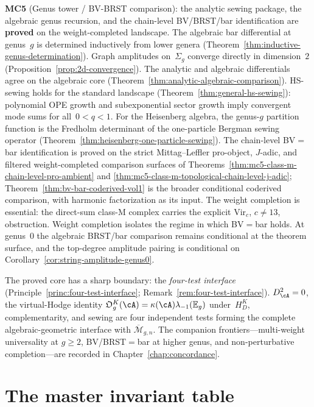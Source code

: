 \noindent\textbf{MC5} (Genus tower / BV-BRST comparison): the
analytic sewing package, the algebraic genus recursion, and the
chain-level BV/BRST/bar identification are \textbf{proved} on the
weight-completed landscape. The algebraic bar differential at
genus~$g$ is determined inductively from lower genera
(Theorem~\ref{thm:inductive-genus-determination}). Graph amplitudes
on~$\Sigma_g$ converge directly in dimension~$2$
(Proposition~\ref{prop:2d-convergence}). The analytic and algebraic
differentials agree on the algebraic core
(Theorem~\ref{thm:analytic-algebraic-comparison}). HS-sewing holds
for the standard landscape (Theorem~\ref{thm:general-hs-sewing}):
polynomial OPE growth and subexponential sector growth imply
convergent mode sums for all~$0 < q < 1$. For the Heisenberg
algebra, the genus-$g$ partition function is the Fredholm
determinant of the one-particle Bergman sewing operator
\textup{(}Theorem~\ref{thm:heisenberg-one-particle-sewing}\textup{)}.
The chain-level BV${}={}$bar identification is proved on the strict
Mittag--Leffler pro-object, $J$-adic, and filtered weight-completed
comparison surfaces of
Theorems~\ref{thm:mc5-class-m-chain-level-pro-ambient} and
\ref{thm:mc5-class-m-topological-chain-level-j-adic};
Theorem~\ref{thm:bv-bar-coderived-vol1} is the broader conditional
coderived comparison, with harmonic factorization as its input. The
weight completion is essential: the direct-sum class-M complex carries
the explicit $\mathrm{Vir}_c$, $c\neq13$, obstruction. Weight
completion isolates the regime in which BV${}={}$bar holds. At
genus~$0$ the algebraic BRST/bar comparison remains conditional at the
theorem surface, and the top-degree amplitude pairing is conditional on
Corollary~\ref{cor:string-amplitude-genus0}.


The proved core has a sharp boundary: the
\emph{four-test interface}
(Principle~\ref{princ:four-test-interface};
Remark~\ref{rem:four-test-interface}).
$D_\cA^2=0$, the virtual-Hodge identity
\(\mathfrak O_g^K(\cA)=\kappa(\cA)\lambda_{-1}(\mathbb E_g)\)
under~$H_D^K$, complementarity, and
sewing are four independent tests forming the
complete algebraic-geometric interface with
$\overline{\mathcal M}_{g,n}$. The companion frontiers---multi-weight
universality at $g\ge 2$, BV/BRST${}={}$bar at higher genus, and
non-perturbative completion---are recorded in
Chapter~\ref{chap:concordance}.


\section{The master invariant table}
\label{sec:master-invariant-table-intro}

